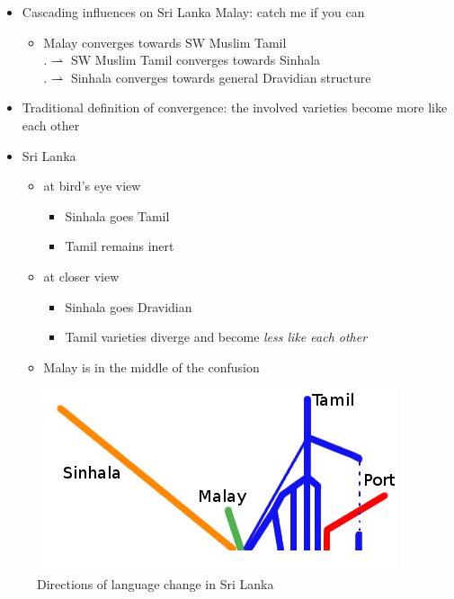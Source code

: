 \documentclass[a4paper,utf8]{article}
\begin{document}
 
\begin{itemize}
 \item Cascading influences on Sri Lanka Malay: catch me if you can
    \begin{itemize}
    \item Malay converges towards SW Muslim Tamil\\
    .\hspace{1cm}$\rightharpoonup$ SW Muslim Tamil converges towards Sinhala\\
    .\hspace{2cm}$\rightharpoonup$ Sinhala converges towards general Dravidian structure
    \end{itemize}
\end{itemize}

\begin{itemize} 
 \item Traditional definition of convergence: the involved varieties become more like each other
 \item Sri Lanka
 \begin{itemize}
  \item  at bird's eye view
 \begin{itemize}
  \item Sinhala goes Tamil
  \item Tamil remains inert
 \end{itemize}
 \item at closer view
  \begin{itemize}
   \item  Sinhala goes Dravidian
   \item Tamil varieties diverge and become \em less \em like each other
  \end{itemize} 
 \item Malay is in the middle of the confusion
\end{itemize}
\end{itemize}

\begin{figure}
 \centering
 \includegraphics[width=\textwidth]{./lggraph.png}
\caption{Directions of language change in Sri Lanka}
\end{figure}
\end{document}

